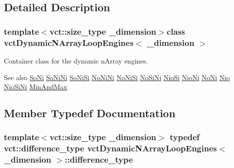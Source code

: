 \subsection{Detailed Description}
\subsubsection*{template$<$vct\+::size\+\_\+type \+\_\+dimension$>$class vct\+Dynamic\+N\+Array\+Loop\+Engines$<$ \+\_\+dimension $>$}

Container class for the dynamic n\+Array engines. 

\begin{DoxySeeAlso}{See also}
\hyperlink{classvct_dynamic_n_array_loop_engines_1_1_so_ni}{So\+Ni} \hyperlink{classvct_dynamic_n_array_loop_engines_1_1_so_ni_ni}{So\+Ni\+Ni} \hyperlink{classvct_dynamic_n_array_loop_engines_1_1_so_ni_si}{So\+Ni\+Si} \hyperlink{classvct_dynamic_n_array_loop_engines_1_1_no_ni_ni}{No\+Ni\+Ni} \hyperlink{classvct_dynamic_n_array_loop_engines_1_1_no_ni_si}{No\+Ni\+Si} \hyperlink{classvct_dynamic_n_array_loop_engines_1_1_no_si_ni}{No\+Si\+Ni} \hyperlink{classvct_dynamic_n_array_loop_engines_1_1_nio_si}{Nio\+Si} \hyperlink{classvct_dynamic_n_array_loop_engines_1_1_nio_ni}{Nio\+Ni} \hyperlink{classvct_dynamic_n_array_loop_engines_1_1_no_ni}{No\+Ni} \hyperlink{classvct_dynamic_n_array_loop_engines_1_1_nio}{Nio} \hyperlink{classvct_dynamic_n_array_loop_engines_1_1_nio_si_ni}{Nio\+Si\+Ni} \hyperlink{classvct_dynamic_n_array_loop_engines_1_1_min_and_max}{Min\+And\+Max} 
\end{DoxySeeAlso}


\subsection{Member Typedef Documentation}
\hypertarget{classvct_dynamic_n_array_loop_engines_ae8d37731d603321cd52e0a6a6d13a017}{}
\subsubsection[{difference\+\_\+type}]{\setlength{\rightskip}{0pt plus 5cm}template$<$vct\+::size\+\_\+type \+\_\+dimension$>$ typedef {\bf vct\+::difference\+\_\+type} {\bf vct\+Dynamic\+N\+Array\+Loop\+Engines}$<$ \+\_\+dimension $>$\+::{\bf difference\+\_\+type}}\label{classvct_dynamic_n_array_loop_engines_ae8d37731d603321cd52e0a6a6d13a017}
\hypertarget{classvct_dynamic_n_array_loop_engines_a072f02e39fa5ce2bfeb95aa4164ce813}{}
